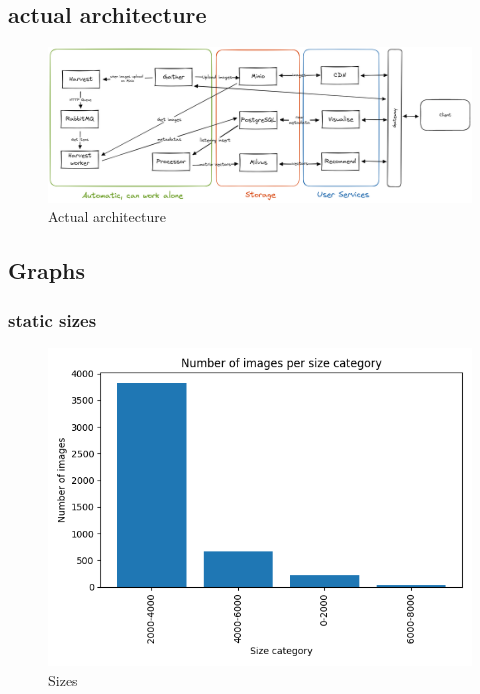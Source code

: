 \documentclass{article}
\begin{document}
    \subsection{actual architecture}\label{subsec:actual_architecture}

    \begin{figure}[htbp]
        \centering
        \includegraphics[width=1.2\textwidth]{img/actual_architecture}
        \caption{Actual architecture}
        \label{fig:actual_architecture}
    \end{figure}

    \newpage

    \subsection{Graphs}\label{subsec:graphs}

    \subsubsection{static sizes}\label{subsubsec:static_sizes}

    \begin{figure}[htbp]
        \centering
        \includegraphics[width=0.7 \textwidth]{img/size_static}
        \caption{Sizes}
        \label{fig:static_sizes}
    \end{figure}
\end{document}
